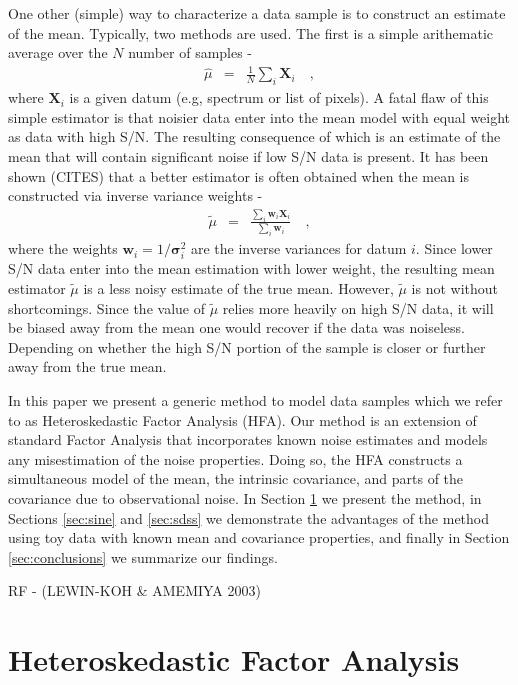 \documentclass[12pt,preprint]{aastex}
\newcommand{\mbf}[1]{\boldsymbol{#1}}
\newcommand{\w}{\mbf{w}}
\newcommand{\X}{\mbf{X}}
\newcommand{\var}{\mbf{\sigma}^2}
\begin{document}
One other (simple) way to characterize a data sample is to construct 
an estimate of the mean.  Typically, two methods are used.  The first is a simple 
arithematic average over the $N$ number of samples - 
\begin{eqnarray}
\hat{\mu} & = &\frac{1}{N} \sum_i \X_i
\quad,
\label{eq:standardmean}
\end{eqnarray}
where $\X_i$ is a given datum (e.g, spectrum or list of pixels).   A fatal flaw of this 
simple estimator is that noisier data enter into the mean model with equal weight as 
data with high S/N.  The resulting consequence of which is an estimate of the mean 
that will contain significant noise if low S/N data is present.  It has been shown (CITES) 
that a better estimator is often obtained when the mean is constructed via inverse 
variance weights - 
\begin{eqnarray}
\tilde{\mu} & = &\frac{ \sum_i \w_i \X_i } {\sum_i \w_i}
\quad,
\label{eq:weightedmean}
\end{eqnarray}
where the weights $\w_i = 1 / \var_i$ are the inverse variances for datum $i$.  Since 
lower S/N data enter into the mean estimation with lower weight, the resulting mean 
estimator $\tilde{\mu}$ is a less noisy estimate of the true mean.  However, 
$\tilde{\mu}$ is not without shortcomings.  Since the value of $\tilde{\mu}$ relies 
more heavily on high S/N data, it will be biased away from the mean one would 
recover if the data was noiseless.  Depending on whether the high S/N portion of the 
sample is closer or further away from the true mean.

In this paper we present a generic method to model data samples which we refer 
to as Heteroskedastic Factor Analysis (HFA).  Our method is an extension of standard 
Factor Analysis that incorporates known noise estimates and models 
any misestimation of the noise properties.  Doing so, the HFA constructs a simultaneous 
model of the mean, the intrinsic covariance, and parts of the covariance due to 
observational noise.  In Section \ref{sec:hfa} we present the method, in Sections
\ref{sec:sine} and \ref{sec:sdss} we demonstrate the advantages of the method using toy data with known 
mean and covariance properties, and finally in Section \ref{sec:conclusions} we summarize 
our findings.


RF - (LEWIN-KOH \& AMEMIYA 2003)

\section{Heteroskedastic Factor Analysis}
\label{sec:hfa}
\end{document}

